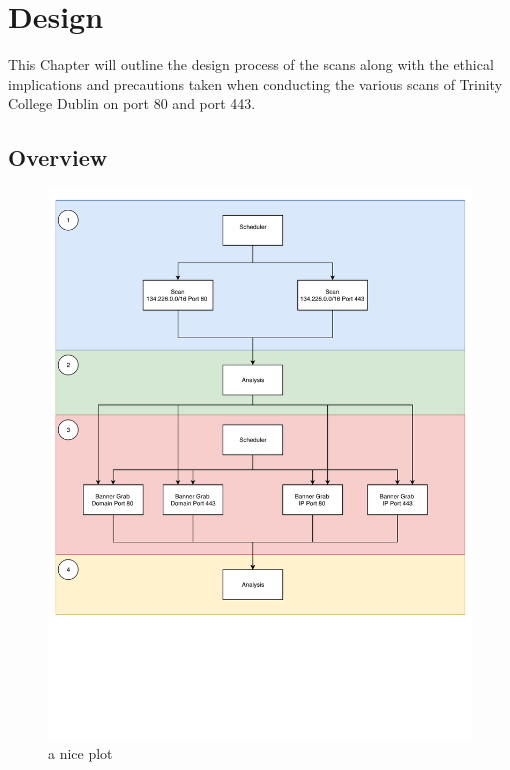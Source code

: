 \documentclass[a4wide,leqno,12pt]{report}
\begin{document}
\chapter{Design}
This Chapter will outline the design process of the scans  along with the ethical implications and precautions taken when conducting the various scans of Trinity College Dublin on port 80 and port 443.
\section{Overview}
\begin{figure}[H]
\centering
\includegraphics[scale=.5,trim={0 6cm 0 0},clip]{pdf_images/design}
\caption{a nice plot}
\label{fig:design}
\end{figure}
\end{document}
